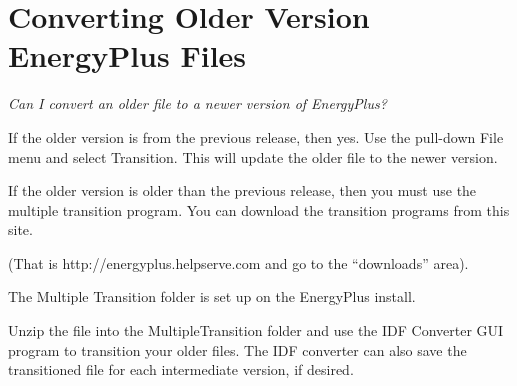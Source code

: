 \section{Converting Older Version EnergyPlus Files}\label{converting-older-version-energyplus-files}

\emph{Can I convert an older file to a newer version of EnergyPlus?}

If the older version is from the previous release, then yes. Use the pull-down File menu and select Transition. This will update the older file to the newer version.

If the older version is older than the previous release, then you must use the multiple transition program. You can download the transition programs from this site.

(That is http://energyplus.helpserve.com and go to the ``downloads'' area).

The Multiple Transition folder is set up on the EnergyPlus install.

Unzip the file into the MultipleTransition folder and use the IDF Converter GUI program to transition your older files. The IDF converter can also save the transitioned file for each intermediate version, if desired.
